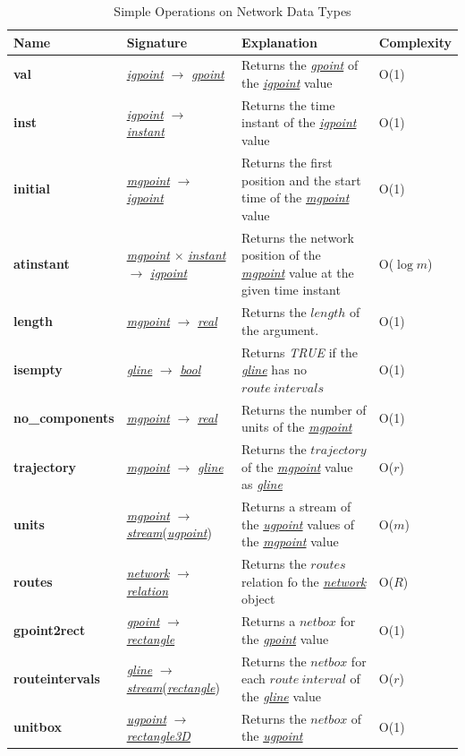 \documentclass[a4paper]{article}
\newcommand{\op}[1]{\textbf{#1}}
\newcommand{\dt}[1]{\textsl{\underline{#1}}}
\newcommand{\true}{\textsl{TRUE}}
\begin{document}
\begin{table}[H]
  \caption{Simple Operations on Network Data Types}
  \label{tab:simplenetoperations}
  \begin{center}
  \begin{tabularx}{1.0\textwidth}{|l|l|X|l|}
  \hline
  \textbf{Name}& \textbf{Signature}& \textbf{Explanation}& \textbf{Complexity}\\
  \hline
\op{val}&\dt{igpoint} $\rightarrow$ \dt{gpoint}& Returns the \dt{gpoint} of the
\dt{igpoint} value&O(1)\\
  \hline
\op{inst}&\dt{igpoint} $\rightarrow$ \dt{instant}& Returns the time instant of the
\dt{igpoint} value &O(1)\\
  \hline
  \op{initial}&\dt{mgpoint} $\rightarrow$ \dt{igpoint}& Returns the first position
and the start time of the \dt{mgpoint} value& O(1)\\
  \hline
  \op{atinstant}&\dt{mgpoint} $\times$ \dt{instant} $\rightarrow$ \dt{igpoint}&
Returns the network position of the \dt{mgpoint} value at the given time instant& O($\log m$)\\
  \hline
  \op{length}&\dt{mgpoint} $\rightarrow$ \dt{real}& Returns the $length$ of the argument.&O(1)\\
  \hline
\op{isempty}&\dt{gline} $\rightarrow$ \dt{bool}& Returns \true{} if the \dt{gline}
has no $route\ intervals$ & O(1)\\
  \hline
\op{no\_components}&\dt{mgpoint} $\rightarrow$ \dt{real}& Returns the number of
units of the \dt{mgpoint} &O(1)\\
  \hline
\op{trajectory}&\dt{mgpoint} $\rightarrow$ \dt{gline}& Returns the $trajectory$
of the \dt{mgpoint} value as \dt{gline}&O($r$)\\
  \hline
  \op{units}&\dt{mgpoint} $\rightarrow$ \dt{stream}(\dt{ugpoint})& Returns a stream
of the \dt{ugpoint} values of the \dt{mgpoint} value& O($m$)\\
  \hline
  \op{routes}& \dt{network} $\rightarrow$ \dt{relation} & Returns the $routes$
relation fo the \dt{network} object & O($R$)\\
  \hline
\op{gpoint2rect}& \dt{gpoint} $\rightarrow$ \dt{rectangle} & Returns a $netbox$
for the \dt{gpoint} value & O(1)\\
  \hline
\op{routeintervals}&\dt{gline} $\rightarrow$ \dt{stream}(\dt{rectangle})& Returns
the $netbox$ for each $route\ interval$ of the \dt{gline} value& O($r$)\\
  \hline
  \op{unitbox}& \dt{ugpoint} $\rightarrow$ \dt{rectangle3D} & Returns the $netbox$
of the \dt{ugpoint} & O(1)\\
  \hline
  \end{tabularx}
  \end{center}
\end{table}
\end{document}
